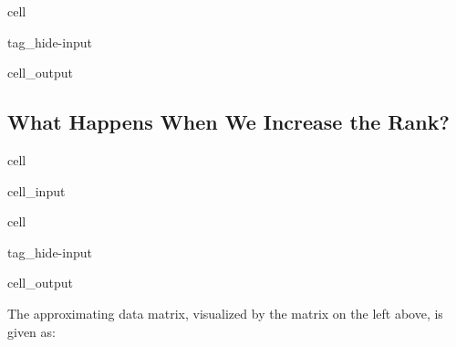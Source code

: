 \documentclass[letterpaper,10pt,english]{jupyterBook}
\begin{document}
\begin{sphinxuseclass}{cell}
\begin{sphinxuseclass}{tag_hide-input}\begin{sphinxVerbatimOutput}

\begin{sphinxuseclass}{cell_output}
\noindent{}

\end{sphinxuseclass}\end{sphinxVerbatimOutput}

\end{sphinxuseclass}
\end{sphinxuseclass}

\subsection{What Happens When We Increase the Rank?}
\label{\detokenize{dim_reduction_mf:what-happens-when-we-increase-the-rank}}
\begin{sphinxuseclass}{cell}\begin{sphinxVerbatimInput}

\begin{sphinxuseclass}{cell_input}
\begin{sphinxVerbatim}[commandchars=\\\{\}]
  \PYG{p}{[}\PYG{p}{]}\PYG{p}{[}\PYG{p}{]}
  \PYG{p}{[}\PYG{p}{]}\PYG{p}{[}\PYG{p}{]}
\end{sphinxVerbatim}

\end{sphinxuseclass}\end{sphinxVerbatimInput}

\end{sphinxuseclass}
\begin{sphinxuseclass}{cell}
\begin{sphinxuseclass}{tag_hide-input}\begin{sphinxVerbatimOutput}

\begin{sphinxuseclass}{cell_output}
\noindent{}

\end{sphinxuseclass}\end{sphinxVerbatimOutput}

\end{sphinxuseclass}
\end{sphinxuseclass}
\sphinxAtStartPar
The approximating data matrix, visualized by the matrix on the left above, is given as:
\end{document}
